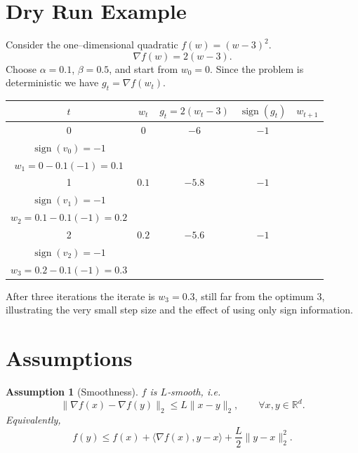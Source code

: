 \documentclass{article}
\newtheorem{assumption}{Assumption}[section]
\begin{document}
\section*{Dry Run Example}
Consider the one–dimensional quadratic $f(w)=(w-3)^{2}$.
\[
\nabla f(w)=2(w-3).
\]
Choose $\alpha=0.1$, $\beta=0.5$, and start from $w_{0}=0$.  
Since the problem is deterministic we have $g_{t}=\nabla f(w_{t})$.

\medskip
\begin{tabular}{c|c|c|c|c}
$t$ & $w_{t}$ & $g_{t}=2(w_{t}-3)$ & $\operatorname{sign}(g_{t})$ & $w_{t+1}$\\ \hline
0 & $0$ & $-6$ & $-1$ &
\begin{minipage}{2.5cm}
$v_{0}=0.5\cdot0+(1-0.5)(-1)=-0.5$\\
$\operatorname{sign}(v_{0})=-1$\\
$w_{1}=0-0.1(-1)=0.1$
\end{minipage}\\[10pt]
1 & $0.1$ & $-5.8$ & $-1$ &
\begin{minipage}{2.5cm}
$v_{1}=0.5(-0.5)+(0.5)(-1)=-0.75$\\
$\operatorname{sign}(v_{1})=-1$\\
$w_{2}=0.1-0.1(-1)=0.2$
\end{minipage}\\[10pt]
2 & $0.2$ & $-5.6$ & $-1$ &
\begin{minipage}{2.5cm}
$v_{2}=0.5(-0.75)+(0.5)(-1)=-0.875$\\
$\operatorname{sign}(v_{2})=-1$\\
$w_{3}=0.2-0.1(-1)=0.3$
\end{minipage}
\end{tabular}

After three iterations the iterate is $w_{3}=0.3$, still far from the optimum $3$, illustrating the very small step size and the effect of using only sign information.

\newpage
\section*{Assumptions}
\label{sec:assumptions}
\begin{assumption}[Smoothness]\label{as:smooth}
$f$ is $L$‑smooth, i.e.
\[
\|\nabla f(x)-\nabla f(y)\|_{2}\le L\|x-y\|_{2},\qquad\forall x,y\in\mathbb{R}^{d}.
\]
Equivalently,
\[
f(y)\le f(x)+\langle\nabla f(x),y-x\rangle+\frac{L}{2}\|y-x\|_{2}^{2}.
\]
\end{assumption}
\end{document}

